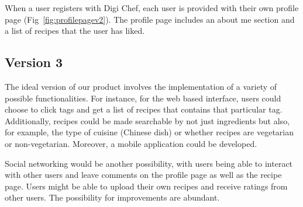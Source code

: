 When a user registers with Digi Chef, each user is provided with their own profile page (Fig~\ref{fig:profilepagev2}). The profile page includes an about me section and a list of recipes that the user has liked. 

\subsection{Version 3}



The ideal version of our product involves the implementation of a variety of possible functionalities. For instance, for the web based interface, users could choose to click tags and get a list of recipes that contains that particular tag. Additionally, recipes could be made searchable by not just ingredients but also, for example, the type of cuisine (Chinese dish) or whether recipes are vegetarian or non-vegetarian. Moreover, a mobile application could be developed. 

Social networking would be another possibility, with users being able to interact with other users and leave comments on the profile page as well as the recipe page. Users might be able to upload their own recipes and receive ratings from other users. The possibility for improvements are abundant.

